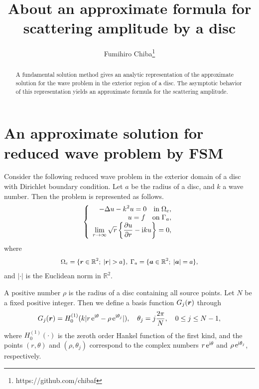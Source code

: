 \documentclass[12pt]{article}
\newcommand*{\Rset}{\mathbb{R}}
\def\e{ \,{\rm e}}
\def\bfvec#1{\mbox{\boldmath$#1$}}
\begin{document}
\title{About an approximate formula for scattering amplitude by a disc}
\author{Fumihiro Chiba\thanks{https://github.com/chibaf}}
\maketitle

\begin{abstract}
A fundamental solution method gives an analytic representation of the approximate solution for the wave problem in the exterior region of a disc. The asymptotic behavior of this representation yields an approximate formula for the scattering amplitude.
\end{abstract}

\section{An approximate solution for reduced wave problem by FSM}
Consider the following reduced wave problem in the exterior domain of a disc with Dirichlet boundary condition. Let $a$ be the radius of a disc, and $k$ a wave number. Then the problem is represented as follows.
\begin{eqnarray*}
\left\{
\begin{array}{r}
\displaystyle -\Delta u -k^2 u = 0 \quad {\rm in} \; \Omega_e,\\
\displaystyle u=f \quad {\rm on} \; \Gamma_a, \\
\displaystyle \lim_{r \rightarrow \infty} \sqrt{r} \left\{\frac{\partial u}{\partial r}- \mathrm{i} k u \right\}=0,
\end{array}
\right.
\end{eqnarray*}
where
\begin{eqnarray*}
{\small \Omega_e=\{\bfvec{r}\in\Rset^2;\;|\bfvec{r}|>a\}, \; \Gamma_a=\{\bfvec{a}\in\Rset^2;\; |\bfvec{a}|=a\},}
\end{eqnarray*}
and $|\cdot|$ is the Euclidean norm in $\Rset^2$.


A positive number $\rho$ is the radius of a disc containing all source points. Let $N$ be a fixed positive integer. Then we define a basis function $G_j(\bfvec{r})$ through
\begin{displaymath}
G_j({\bfvec{r}}) = H_0^{(1)}(k|r\e^{\mathrm{i}\theta}- \rho \e^{\mathrm{i}{\theta}_j}|),
\quad \theta_j=j\frac{2\pi}{N},\quad 0 \leq j \leq N-1,
\end{displaymath}
where $H_0^{(1)}(\cdot)$ is the zeroth order Hankel function of the first kind, and the points $(r,\theta)$ and $(\rho,\theta_j)$ correspond to the complex numbers $r\e^{\mathrm{i}\theta}$ and $\rho \e^{\mathrm{i}{\theta}_j}$, respectively.
\end{document}
